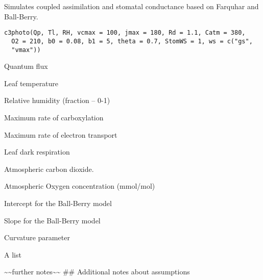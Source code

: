 \documentclass[letterpaper]{book}
\begin{document}
%
\begin{Description}\relax
Simulates coupled assimilation and stomatal conductance
based on Farquhar and Ball-Berry.
\end{Description}
%
\begin{Usage}
\begin{verbatim}
c3photo(Qp, Tl, RH, vcmax = 100, jmax = 180, Rd = 1.1, Catm = 380,
  O2 = 210, b0 = 0.08, b1 = 5, theta = 0.7, StomWS = 1, ws = c("gs",
  "vmax"))
\end{verbatim}
\end{Usage}
%
\begin{Arguments}
\begin{ldescription}
\item[\code{Qp}] Quantum flux

\item[\code{Tl}] Leaf temperature

\item[\code{RH}] Relative humidity (fraction -- 0-1)

\item[\code{vcmax}] Maximum rate of carboxylation

\item[\code{jmax}] Maximum rate of electron transport

\item[\code{Rd}] Leaf dark respiration

\item[\code{Catm}] Atmospheric carbon dioxide.

\item[\code{O2}] Atmospheric Oxygen concentration (mmol/mol)

\item[\code{b0}] Intercept for the Ball-Berry model

\item[\code{b1}] Slope for the Ball-Berry model

\item[\code{theta}] Curvature parameter
\end{ldescription}
\end{Arguments}
%
\begin{Value}
A list
\end{Value}
%
\begin{Note}\relax
\textasciitilde{}\textasciitilde{}further notes\textasciitilde{}\textasciitilde{} \#\# Additional notes about assumptions
\end{Note}
\end{document}
